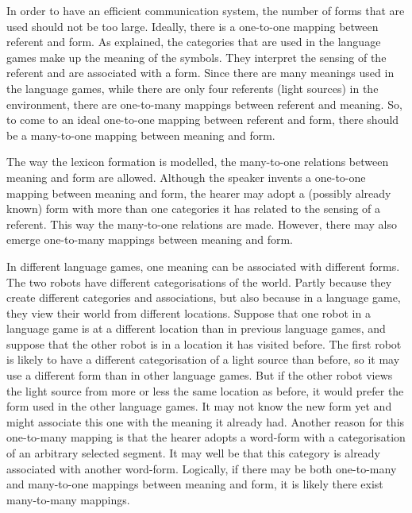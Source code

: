 In order to have an efficient communication system, the number of forms that are used should not be too large. Ideally, there is a one-to-one mapping between referent and form. As explained, the categories that are used in the language games make up the meaning of the symbols. They interpret the sensing of the referent and are associated with a form. Since there are many meanings used in the language games, while there are only four referents (light sources) in the environment, there are one-to-many mappings between referent and meaning. So, to come to an ideal one-to-one mapping between referent and form, there should be a many-to-one mapping between meaning and form.

The way the lexicon formation is modelled, the many-to-one relations between meaning and form are allowed. Although the speaker invents a one-to-one mapping between meaning and form, the hearer may adopt a (possibly already known) form with more than one categories it has related to the sensing of a referent. This way the many-to-one relations are made. However, there may also emerge one-to-many mappings between meaning and form. 

In different language games, one meaning can be associated with different forms. The two robots have different categorisations of the world. Partly because they create different categories and associations, but also because in a language game, they view their world from different locations. Suppose that one robot in a language game is at a different location than in previous language games, and suppose that the other robot is in a location it has visited before. The first robot is likely to have a different categorisation of a light source than before, so it may use a different form than in other language games. But if the other robot views the light source from more or less the same location as before, it would prefer the form used in the other language games. It may not know the new form yet and might associate this one with the meaning it already had. Another reason for this one-to-many mapping is that the hearer adopts a word-form with a categorisation of an arbitrary selected segment. It may well be that this category is already associated with another word-form. Logically, if there may be both one-to-many and many-to-one mappings between meaning and form, it is likely there exist many-to-many mappings.

